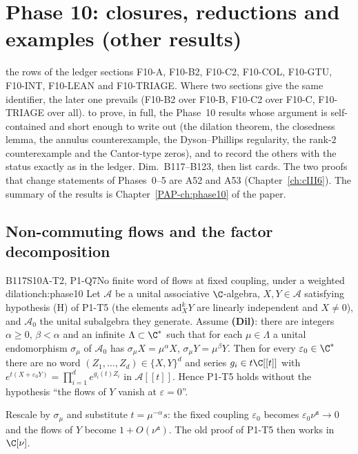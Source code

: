 \chapter[Phase 10 closures]{Phase 10: closures, reductions and examples (other results)}\label{ch:cIV4}
\chapterbrief
{the rows of the ledger sections F10-A, F10-B2, F10-C2, F10-COL, F10-GTU, F10-INT, F10-LEAN and F10-TRIAGE. Where two sections give the same identifier, the later one prevails (F10-B2 over F10-B, F10-C2 over F10-C, F10-TRIAGE over all).}
{to prove, in full, the Phase~10 results whose argument is self-contained and short enough to write out (the dilation theorem, the closedness lemma, the annulus counterexample, the Dyson--Phillips regularity, the rank-$2$ counterexample and the Cantor-type zeros), and to record the others with the status exactly as in the ledger.}
{Dim.~B117--B123, then list cards. The two proofs that change statements of Phases~0--5 are A52 and A53 (Chapter~\ref{ch:cIII6}). The summary of the results is Chapter~\ref{PAP-ch:phase10} of the paper.}

\section{Non-commuting flows and the factor decomposition}

\begin{dimcard}{B117}{S10A-T2, P1-Q7}{No finite word of flows at fixed coupling, under a weighted dilation}{\pw}{ch:phase10}
Let $\mathcal A$ be a unital associative $\C$-algebra, $X,Y\in\mathcal A$ satisfying hypothesis (H) of P1-T5 (the elements $\mathrm{ad}_X^kY$ are linearly independent and $X\ne0$), and $\mathcal A_0$ the unital subalgebra they generate. Assume \textbf{(Dil)}: there are integers $\alpha\ge0$, $\beta<\alpha$ and an infinite $\Lambda\subset\C^*$ such that for each $\mu\in\Lambda$ a unital endomorphism $\sigma_\mu$ of $\mathcal A_0$ has $\sigma_\mu X=\mu^\alpha X$, $\sigma_\mu Y=\mu^\beta Y$. Then for every $\varepsilon_0\in\C^*$ there are no word $(Z_1,\dots,Z_d)\in\{X,Y\}^d$ and series $g_i\in t\C[[t]]$ with $e^{t(X+\varepsilon_0Y)}=\prod_{i=1}^de^{g_i(t)Z_i}$ in $\mathcal A[[t]]$. Hence P1-T5 holds without the hypothesis ``the flows of $Y$ vanish at $\varepsilon=0$''.
\end{dimcard}

\begin{proofidea}
Rescale by $\sigma_\mu$ and substitute $t=\mu^{-\alpha}s$: the fixed coupling $\varepsilon_0$ becomes $\varepsilon_0\nu^{\mathfrak a}\to0$ and the flows of $Y$ become $1+O(\nu^{\mathfrak a})$. The old proof of P1-T5 then works in $\C[\nu]$.
\end{proofidea}

